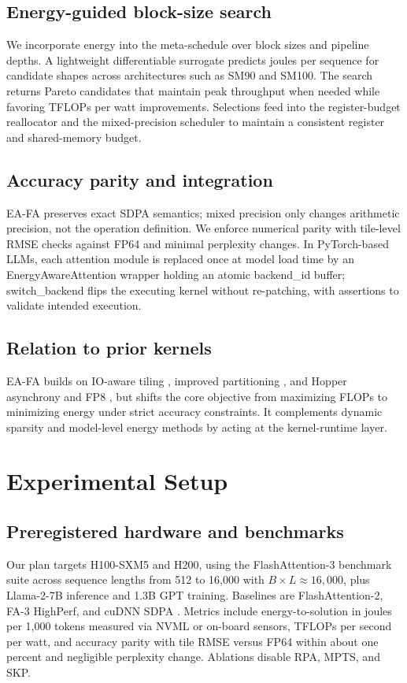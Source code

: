 \documentclass{article}
\begin{document}
\subsection{Energy-guided block-size search}
We incorporate energy into the meta-schedule over block sizes and pipeline depths. A lightweight differentiable surrogate predicts joules per sequence for candidate shapes across architectures such as SM90 and SM100. The search returns Pareto candidates that maintain peak throughput when needed while favoring TFLOPs per watt improvements. Selections feed into the register-budget reallocator and the mixed-precision scheduler to maintain a consistent register and shared-memory budget.

\subsection{Accuracy parity and integration}
EA-FA preserves exact SDPA semantics; mixed precision only changes arithmetic precision, not the operation definition. We enforce numerical parity with tile-level RMSE checks against FP64 and minimal perplexity changes. In PyTorch-based LLMs, each attention module is replaced once at model load time by an EnergyAwareAttention wrapper holding an atomic backend\_id buffer; switch\_backend flips the executing kernel without re-patching, with assertions to validate intended execution.

\subsection{Relation to prior kernels}
EA-FA builds on IO-aware tiling \cite{dao-2022-flashattention}, improved partitioning \cite{dao-2023-flashattention}, and Hopper asynchrony and FP8 \cite{shah-2024-flashattention}, but shifts the core objective from maximizing FLOPs to minimizing energy under strict accuracy constraints. It complements dynamic sparsity \cite{pagliardini-2023-fast} and model-level energy methods \cite{liu-2022-ecoformer} by acting at the kernel-runtime layer.

\section{Experimental Setup}
\subsection{Preregistered hardware and benchmarks}
Our plan targets H100-SXM5 and H200, using the FlashAttention-3 benchmark suite across sequence lengths from 512 to 16,000 with \(B\times L \approx 16{,}000\), plus Llama-2-7B inference and 1.3B GPT training. Baselines are FlashAttention-2, FA-3 HighPerf, and cuDNN SDPA \cite{dao-2023-flashattention,shah-2024-flashattention}. Metrics include energy-to-solution in joules per 1,000 tokens measured via NVML or on-board sensors, TFLOPs per second per watt, and accuracy parity with tile RMSE versus FP64 within about one percent and negligible perplexity change. Ablations disable RPA, MPTS, and SKP.
\end{document}
